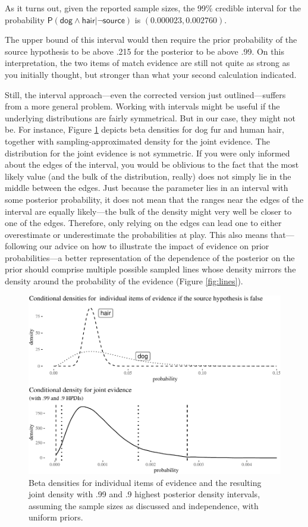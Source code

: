 \documentclass[
  10pt,
  dvipsnames,enabledeprecatedfontcommands]{scrartcl}
\newcommand{\s}[1]{\mbox{$\mathsf{#1}$}}
\begin{document}
As it turns out, given the reported sample sizes, the 99\% credible
interval for the probability
\(\mathsf{P}(\s{dog}\wedge \s{hair} \vert \neg \s{source})\) is
\((0.000023, 0.002760)\). 

The upper bound of this interval would then require the prior
probability of the source hypothesis to be above .215 for the posterior
to be above .99. On this interpretation, the two items of match evidence
are still not quite as strong as you initially thought, but stronger
than what your second calculation indicated.

Still, the interval approach---even the corrected version just
outlined---suffers from a more general problem. Working with intervals
might be useful if the underlying distributions are fairly symmetrical.
But in our case, they might not be. For instance, Figure
\ref{fig:densities} depicts beta densities for dog fur and human hair,
together with sampling-approximated density for the joint evidence. The
distribution for the joint evidence is not symmetric. If you were only
informed about the edges of the interval, you would be oblivious to the
fact that the most likely value (and the bulk of the distribution,
really) does not simply lie in the middle between the edges. Just
because the parameter lies in an interval with some posterior
probability, it does not mean that the ranges near the edges of the
interval are equally likely---the bulk of the density might very well be
closer to one of the edges. Therefore, only relying on the edges can
lead one to either overestimate or underestimate the probabilities at
play. This also means that---following our advice on how to illustrate
the impact of evidence on prior probabilities---a better representation
of the dependence of the posterior on the prior should comprise multiple
possible sampled lines whose density mirrors the density around the
probability of the evidence (Figure \ref{fig:lines}).

\begin{figure}[H]

\begin{center}\includegraphics[width=0.8\linewidth]{paper-outline_files/figure-latex/fig:densities-1} \end{center}
\caption{Beta densities for individual items of evidence and the resulting joint density with .99 and .9 highest posterior density intervals, assuming the sample sizes as discussed and independence, with uniform priors.}
\label{fig:densities}
\end{figure}
\end{document}
